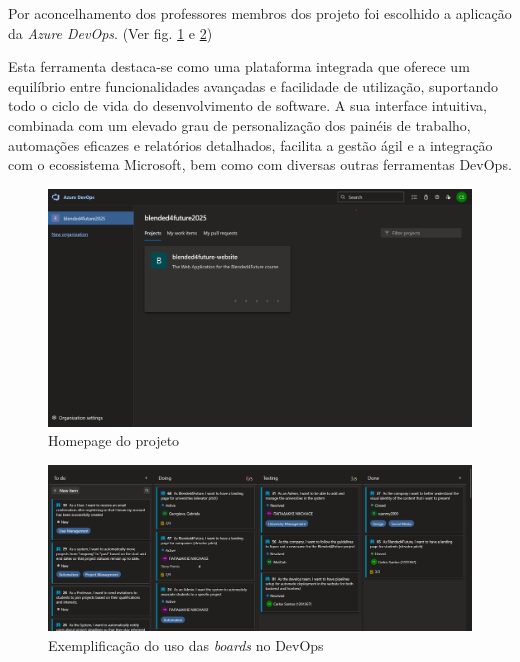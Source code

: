 Por aconcelhamento dos professores membros dos projeto foi escolhido a aplicação da \textit{Azure DevOps}. (Ver fig. \ref{fig:devops-homepage} e \ref{fig:devops-boards})

Esta ferramenta destaca-se como uma plataforma integrada que oferece um equilíbrio entre funcionalidades avançadas e facilidade de utilização, suportando todo o ciclo de vida do desenvolvimento de software. A sua interface intuitiva, combinada com um elevado grau de personalização dos painéis de trabalho, automações eficazes e relatórios detalhados, facilita a gestão ágil e a integração com o ecossistema Microsoft, bem como com diversas outras ferramentas DevOps. 

\begin{figure}
    \includegraphics[width=\linewidth]{capitulos/cap1-introducao/imagens/ferramentas/devops-homepage.png}
    \caption{Homepage do projeto}
    \label{fig:devops-homepage}
\end{figure}

\begin{figure}
    \includegraphics[width=\linewidth]{capitulos/cap1-introducao/imagens/ferramentas/devops-board.png}
    \caption{Exemplificação do uso das \textit{boards} no DevOps}
    \label{fig:devops-boards}
\end{figure}

